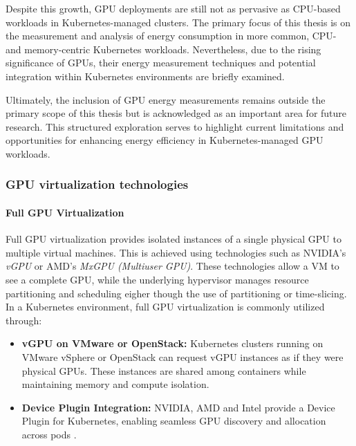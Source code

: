 Despite this growth, GPU deployments are still not as pervasive as CPU-based workloads in Kubernetes-managed clusters. The primary focus of this thesis is on the measurement and analysis of energy consumption in more common, CPU- and memory-centric Kubernetes workloads. Nevertheless, due to the rising significance of GPUs, their energy measurement techniques and potential integration within Kubernetes environments are briefly examined.

Ultimately, the inclusion of GPU energy measurements remains outside the primary scope of this thesis but is acknowledged as an important area for future research. This structured exploration serves to highlight current limitations and opportunities for enhancing energy efficiency in Kubernetes-managed GPU workloads.

\subsubsection{GPU virtualization technologies}

\paragraph{Full GPU Virtualization}

Full GPU virtualization provides isolated instances of a single physical GPU to multiple virtual machines. This is achieved using technologies such as NVIDIA's \textit{vGPU} or AMD's \textit{MxGPU (Multiuser GPU)}. These technologies allow a VM to see a complete GPU, while the underlying hypervisor manages resource partitioning and scheduling \cite{nvidia_virtualization, amd_instinct_virtualization} eigher though the use of partitioning or time-slicing. In a Kubernetes environment, full GPU virtualization is commonly utilized through:
\begin{itemize}
    \item \textbf{vGPU on VMware or OpenStack:} Kubernetes clusters running on VMware vSphere or OpenStack can request vGPU instances as if they were physical GPUs. These instances are shared among containers while maintaining memory and compute isolation.
    \item \textbf{Device Plugin Integration:} NVIDIA, AMD and Intel provide a Device Plugin for Kubernetes, enabling seamless GPU discovery and allocation across pods \cite{k8s_gpu_support}.
\end{itemize}

